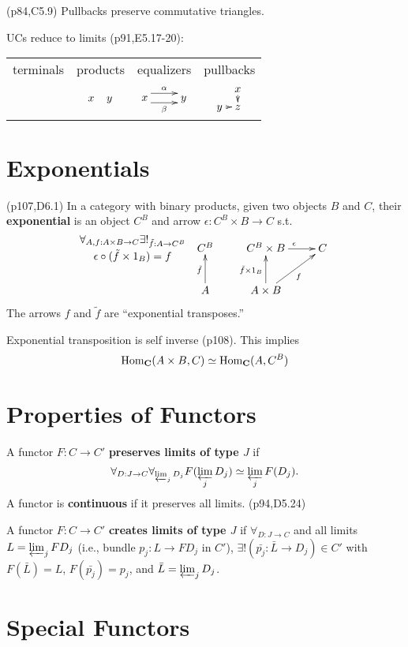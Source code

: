 \documentclass[10pt,twocolumn,letterpaper]{article}
\newcommand{\defn}[1]{{\bf #1}}
\begin{document}
  (p84,C5.9) Pullbacks preserve commutative triangles.

  UCs reduce to limits (p91,E5.17-20):
  \begin{tabular}{cccc}
      terminals & products & equalizers & pullbacks \\
      & $\xymatrix@C5pt{x & y}$
      & $\xymatrix{x \ar@<1ex>[r]^{\alpha} \ar@<-1ex>[r]_{\beta} & y}$
      & $\xymatrix@C5pt@R5pt{& x \ar[d] \\ y \ar[r] & z}$
  \end{tabular}

\section{Exponentials}

  (p107,D6.1) In a category with binary products, given two objects $B$ and $C$,
  their \defn{exponential} is an object $C^B$ and arrow $\epsilon : C^B \times B \to C$
  s.t.
     \[\xymatrix{
     {}\save[]+<-1cm,0cm>*\txt<8pc>{$\forall_{A,f : A \times B \to C}\exists!_{\tilde f : A \to C^B}$\\
                                    $\epsilon \circ (\tilde f \times 1_B) = f$}\restore
     & C^B & C^B \times B \ar[r]^\epsilon & C \\
     & A \ar[u]^{\tilde f} & A \times B \ar[u]^{\tilde f \times 1_B} \ar[ur]_f
     }\]
  The arrows $f$ and $\tilde f$ are ``exponential transposes.''

  Exponential transposition is self inverse (p108).  This implies
    \[ \mbox{Hom}_{\bf C}(A \times B, C) \simeq \mbox{Hom}_{\bf C}(A, C^B) \]

\section{Properties of Functors}

  A functor $F : C \to C'$ \defn{preserves limits of type $J$} if
    \[ \forall_{D : J \to C}\forall_{\varprojlim_j D_j} F(\varprojlim_j D_j) \simeq \varprojlim_j F(D_j).\]
  A functor is \defn{continuous} if it preserves all limits. (p94,D5.24)

  A functor $F : C \to C'$ \defn{creates limits of type $J$} if $\forall_{D : J \to C}$
  and all limits $L = \varprojlim_j FD_j$ (i.e., bundle $p_j : L \to FD_j$ in $C'$),
  $\exists! (\bar{p_j} : \bar{L} \to D_j) \in C'$ with $F(\bar L) = L$, $F(\bar{p_j}) = p_j$,
  and $\bar L = \varprojlim_j D_j$. 

\section{Special Functors}
\end{document}
